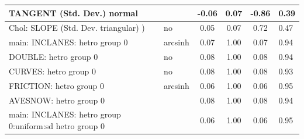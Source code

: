 \begin{table}
\begin{center}
\begin{tabular}{|l|l|c|c|c|l|}
			\hline
			TANGENT (Std. Dev.) normal &  & -0.06 & 0.07 & -0.86 & 0.39 \\
			\hline
			 Chol: SLOPE (Std. Dev. triangular) ) & no & 0.05 & 0.07 & 0.72 & 0.47 \\
			\hline
			main: INCLANES: hetro group 0 & arcsinh & 0.07 & 1.00 & 0.07 & 0.94 \\
			\hline
			DOUBLE: hetro group 0 & no & 0.08 & 1.00 & 0.08 & 0.94 \\
			\hline
			CURVES: hetro group 0 & no & 0.08 & 1.00 & 0.08 & 0.93 \\
			\hline
			FRICTION: hetro group 0 & arcsinh & 0.06 & 1.00 & 0.06 & 0.95 \\
			\hline
			AVESNOW: hetro group 0 &  & 0.08 & 1.00 & 0.08 & 0.94 \\
			\hline
			main: INCLANES: hetro group 0:uniform:sd  hetro group 0 &  & 0.06 & 1.00 & 0.06 & 0.95 \\
			\hline
		\end{tabular}
	\end{center}
\end{table}
